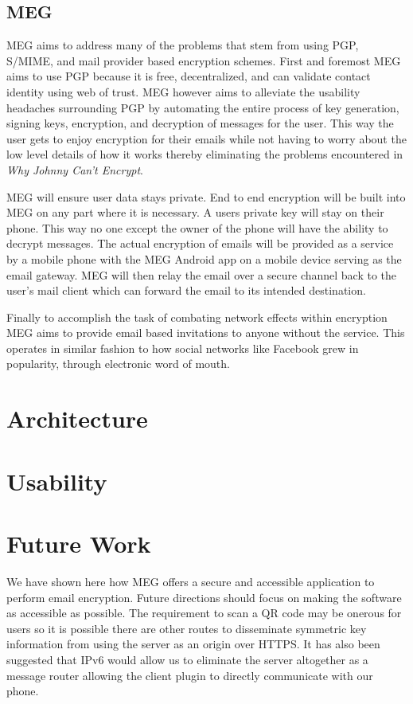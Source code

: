 \documentclass[10pt,twocolumn]{article}
\begin{document}
\subsection{MEG}
\par MEG aims to address many of the problems that stem from using PGP, S/MIME, and mail provider based encryption schemes. First and foremost MEG aims to use PGP because it is free, decentralized, and can validate contact identity using web of trust. MEG however aims to alleviate the usability headaches surrounding PGP by automating the entire process of key generation, signing keys, encryption, and decryption of messages for the user. This way the user gets to enjoy encryption for their emails while not having to worry about the low level details of how it works thereby eliminating the problems encountered in \textit{Why Johnny Can't Encrypt}\cite{whitten1999johnny}.
\par MEG will ensure user data stays private. End to end encryption will be built into MEG on any part where it is necessary. A users private key will stay on their phone. This way no one except the owner of the phone will have the ability to decrypt messages. The actual encryption of emails will be provided as a service by a mobile phone with the MEG Android app on a mobile device serving as the email gateway. MEG will then relay the email over a secure channel back to the user's mail client which can forward the email to its intended destination.
\par Finally to accomplish the task of combating network effects within encryption MEG aims to provide email based invitations to anyone without the service. This operates in similar fashion to how social networks like Facebook grew in popularity, through electronic word of mouth\cite{trusov2009effects}.

\section{Architecture}

\section{Usability}

\section{Future Work}
We have shown here how MEG offers a secure and accessible application to perform email encryption. Future directions should focus on making the software as accessible as possible. The requirement to scan a QR code may be onerous for users so it is possible there are other routes to disseminate symmetric key information from using the server as an origin over HTTPS. It has also been suggested that IPv6 would allow us to eliminate the server altogether as a message router allowing the client plugin to directly communicate with our phone.
\end{document}
